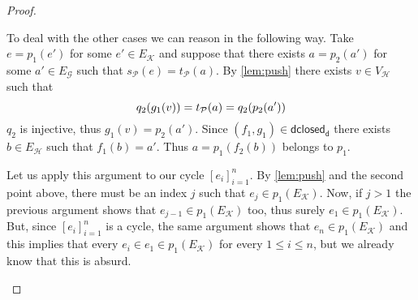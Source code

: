 \documentclass[runningheads,envcountsect]{lmcs}
\newcommand{\rtd}{\mathsf{dclosed_{d}}}
\theoremstyle{plain}
\theoremstyle{definition}
\begin{document}
\begin{proof}
\begin{itemize}
To deal with the other cases we can reason in the following way. Take $e= p_1(e')$ for some $e'\in E_{\mathcal{K}}$ and suppose that there exists $a=p_2(a')$ for some $a'\in E_{\mathcal{G}}$ such that $s_{\mathcal{P}}(e)=t_{\mathcal{P}}(a)$.
By \cref{lem:push} there exists  $v\in V_{\mathcal{H}}$ such that
\[q_2\qty(g_1(v))=t_{\mathcal{P}}(a)=q_2\qty(p_2(a'))\]
$q_2$ is injective, thus $g_1(v)=p_2(a')$. Since $(f_1, g_1)\in \rtd$ there exists $b\in E_{\mathcal{H}}$ such that $f_1(b)=a'$. Thus $a=p_1(f_2(b))$ belongs to $p_1$.

Let us apply this argument to our cycle $[e_i]^n_{i=1}$. By \cref{lem:push} and the second point above, there must be an index $j$ such that $e_j\in p_1(E_{\mathcal{K}})$. Now, if $j>1$ the previous argument shows that $e_{j-1}\in p_1(E_{\mathcal{K}})$ too, thus surely $e_1\in  p_1(E_{\mathcal{K}})$. But, since  $[e_i]^n_{i=1}$ is a cycle, the same argument shows that $e_n\in  p_1(E_{\mathcal{K}})$ and this implies that every $e_i\in e_1\in  p_1(E_{\mathcal{K}})$ for every $1\leq i \leq n$, but we already know that this is absurd.
	 \qedhere
\end{itemize}		
\end{proof}
\end{document}
